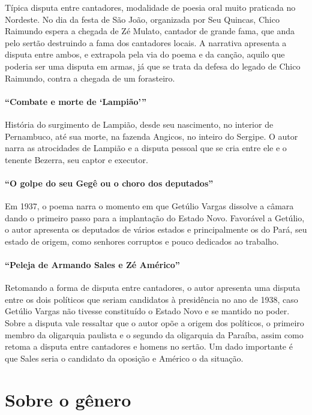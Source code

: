 Típica disputa entre cantadores, modalidade de 
poesia oral muito praticada no Nordeste. No dia da
festa de São João, organizada por Seu Quincas, Chico Raimundo espera a
chegada de Zé Mulato, cantador de grande fama, que anda pelo sertão
destruindo a fama dos cantadores locais. A narrativa apresenta a
disputa entre ambos, e extrapola pela via do poema e da canção, aquilo
que poderia ser uma disputa em armas, já que se trata da defesa do
legado de Chico Raimundo, contra a chegada de um forasteiro.


\paragraph{``Combate e morte de `Lampião'''}

História do surgimento de Lampião, desde seu nascimento, no interior de
Pernambuco, até sua morte, na fazenda Angicos, no inteiro do Sergipe. O
autor narra as atrocidades de Lampião e a disputa pessoal que se cria
entre ele e o tenente Bezerra, seu captor e executor.

\paragraph{``O golpe do seu Gegê ou o choro dos deputados''}

Em 1937, o poema narra o momento em que Getúlio Vargas dissolve a câmara
dando o primeiro passo para a implantação do Estado Novo. Favorável a
Getúlio, o autor apresenta os deputados de vários estados e
principalmente os do Pará, seu estado de origem, como senhores
corruptos e pouco dedicados ao trabalho.

\paragraph{``Peleja de Armando Sales e Zé Américo''}

Retomando a forma de disputa entre cantadores, o autor apresenta uma
disputa entre os dois políticos que seriam candidatos à presidência no
ano de 1938, caso Getúlio Vargas não tivesse constituído o Estado Novo
e se mantido no poder. Sobre a disputa vale ressaltar que o autor opõe
a origem dos políticos, o primeiro membro da oligarquia paulista e o
segundo da oligarquia da Paraíba, assim como retoma a disputa entre
cantadores e homens no sertão. Um dado importante é que Sales seria o
candidato da oposição e Américo o da situação. 


\section{Sobre o gênero}

